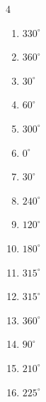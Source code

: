 \begin{multicols}{4}
\begin{enumerate}
  \item $\displaystyle 330^{\circ}$

  \item $\displaystyle 360^{\circ}$
        \phantom{$\displaystyle =2\pi$}

  \item $\displaystyle 30^{\circ}$

  \item $\displaystyle 60^{\circ}$

  \item $\displaystyle 300^{\circ}$

  \item $\displaystyle 0^{\circ}$
        \phantom{$\displaystyle =0$}

  \item $\displaystyle 30^{\circ}$

  \item $\displaystyle 240^{\circ}$

  \item $\displaystyle 120^{\circ}$

  \item $\displaystyle 180^{\circ}$
        \phantom{$\displaystyle =\pi$}

  \item $\displaystyle 315^{\circ}$

\columnbreak %

  \item $\displaystyle 315^{\circ}$

  \item $\displaystyle 360^{\circ}$
        \phantom{$\displaystyle =2\pi$}

  \item $\displaystyle 90^{\circ}$

  \item $\displaystyle 210^{\circ}$

  \item $\displaystyle 225^{\circ}$


\end{enumerate}
\end{multicols}
